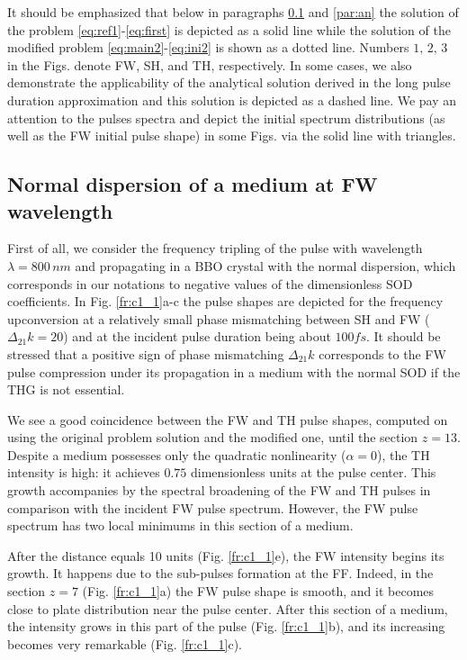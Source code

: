 \documentclass[a4paper, 12pt, onecolumn]{extarticle}
\begin{document}
It should be emphasized that below in paragraphs \ref{par:nor} and \ref{par:an} the solution of the problem \eqref{eq:ref1}-\eqref{eq:first} is depicted as a solid line while the solution of the modified problem  \eqref{eq:main2}-\eqref{eq:ini2} is shown as a dotted line.  Numbers \(1,\,2,\,3\) in the Figs. denote FW, SH, and TH, respectively. In some cases, we also demonstrate the applicability of the analytical solution derived in the long pulse duration approximation and this solution is depicted as a dashed line. We pay an attention to the pulses spectra and depict the initial spectrum distributions (as well as the FW initial pulse shape) in some Figs. via the solid line with triangles.

\subsection{Normal dispersion of a medium at FW wavelength}
\label{par:nor}
First of all, we consider the frequency tripling of the pulse with wavelength \(\lambda=800\,nm\) and propagating in a BBO crystal with the normal dispersion, which corresponds in our notations to negative values of the dimensionless SOD coefficients. In Fig. \ref{fr:c1_1}a-c the pulse shapes are depicted for the frequency upconversion at a relatively small phase mismatching between SH and FW (\(\Delta_{21}k=20\)) and at the incident pulse duration being about \(100fs\). It should be stressed that a positive sign of phase mismatching \(\Delta_{21}k\) corresponds to the FW pulse compression under its propagation in a medium with the normal SOD if the THG is not essential.

We see a good coincidence between the FW and TH pulse shapes, computed on using the original problem solution and the modified one, until the section \(z=13\). Despite a medium possesses only the quadratic nonlinearity (\(\alpha=0\)), the TH intensity is high: it achieves \(0.75\) dimensionless units at the pulse center. This growth accompanies by the spectral broadening of the FW and TH pulses in comparison with the incident FW pulse spectrum. However, the FW pulse spectrum has two local minimums in this section of a medium. 

After the distance equals 10 units (Fig. \ref{fr:c1_1}e), the FW intensity begins its growth. It happens due to the sub-pulses formation at the FF. Indeed, in the section \(z=7\) (Fig. \ref{fr:c1_1}a) the FW pulse shape is smooth, and it becomes close to plate distribution near the pulse center. After this section of a medium, the intensity grows in this part of the pulse (Fig. \ref{fr:c1_1}b), and its increasing becomes very remarkable (Fig. \ref{fr:c1_1}c). 
\end{document}

